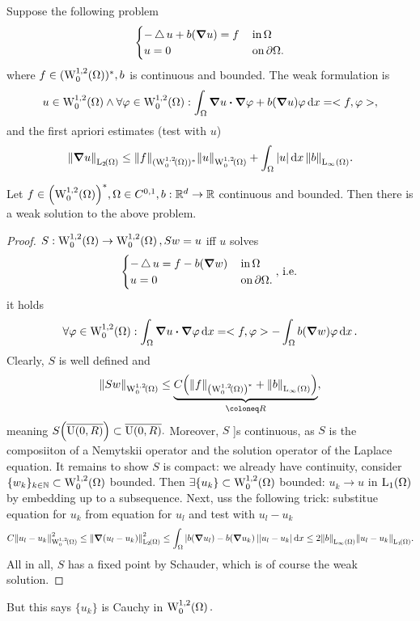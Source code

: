 \documentclass{article}
\begin{document}
\begin{example}
	Suppose the following problem
	\[
		\begin{cases}
			- \operatorname{\bigtriangleup} u + b\qty(\grad u) = f & \, \text{in} \, \Omega \\
			u = 0 & \, \text{on} \, \partial \Omega.
		\end{cases}
	\]
	where $f \in (\WkpzeroSet[1][2]{\Omega})^{*}, b$ is continuous and bounded. The weak formulation is
	\[
		u \in \WkpzeroSet[1][2]{\Omega} \wedge \forall \varphi \in \WkpzeroSet[1][2]{\Omega}: \int_{\Omega}\grad u \vdot \grad \varphi + b\qty(\grad u) \varphi\dd{x} = <f,\varphi>,
	\]
	and the first apriori estimates (test with $u$)
	\[
		\norm{\grad u}_{\LpSet[2]{\Omega}} \leq \norm{f}_{(\WkpzeroSet[1][2]{\Omega})^{*}} \norm{u}_{\WkpzeroSet[1][2]{\Omega}}+ \int_{\Omega}|u|\dd{x} \norm{b}_{\LinfSet{\Omega}}.
	\]
	\begin{theorem}
		Let $f \in \qty(\WkpzeroSet[1][2]{\Omega})^{*}, \Omega \in C^{0,1}, b: \R^d \to \R$ continuous and bounded. Then there is a weak solution to the above problem.
	\end{theorem}
	\begin{proof}
		$S: \WkpzeroSet[1][2]{\Omega} \to \WkpzeroSet[1][2]{\Omega}, Sw = u$ iff $u$ solves
		\[
			\begin{cases}
				- \operatorname{\bigtriangleup} u = f - b\qty(\grad w) & \, \text{in} \, \Omega \\
				u = 0 & \, \text{on} \, \partial \Omega.
			\end{cases}, \, \text{i.e.} \,
		\]
		it holds
		\[
			\forall \varphi \in \WkpzeroSet[1][2]{\Omega}: \int_{\Omega}\grad u \vdot \grad \varphi\dd{x} = <f, \varphi> - \int_{\Omega}b\qty(\grad w) \varphi\dd{x}.
		\]
		Clearly, $S$ is well defined and
		\[
			\norm{Sw}_{\WkpzeroSet[1][2]{\Omega}} \leq \underbrace{C\qty(\norm{f}_{\qty(\WkpzeroSet[1][2]{\Omega})^{*}}+ \norm{b}_{\LinfSet{\Omega}})}_{\coloneq R},
		\]
		meaning $S\qty(\overline{\text{U}(0,R)}) \subset \overline{\text{U}(0,R)}.$
		Moreover, $S$ ]s continuous, as $S$ is the composiiton of a Nemytskii operator and the solution operator of the Laplace equation. It remains to show $S$ is compact: we already have continuity, consider $\{w_k\}_{k \in \N} \subset \WkpzeroSet[1][2]{\Omega}$ bounded. Then $\exists \{u_k\} \subset \WkpzeroSet[1][2]{\Omega}$ bounded: $u_k \to u$ in $\LpSet[1]{\Omega}$ by embedding up to a subsequence. Next, uss the following trick: substitue equation for $u_k$ from equation for $u_l$ and test with $u_l - u_k$
		\[
			C \norm{u_l - u_k}_{\WkpzeroSet[1][2]{\Omega}}^{2} \leq	\norm{\grad\qty(u_l - u_k)}_{\LpSet[2]{\Omega}}^{2} \leq \int_{\Omega}|b(\grad u_l) - b\qty(\grad u_k)| |u_l - u_k|\dd{x} \leq 2 \norm{b}_{\LinfSet{\Omega}}\norm{u_l-u_k}_{\LpSet[1]{\Omega}}.
		\]
		All in all, $S$ has a fixed point by Schauder, which is of course the weak solution.
	\end{proof}
	But this says $\{u_k\}$ is Cauchy in $\WkpzeroSet[1][2]{\Omega}.$
\end{example}
\end{document}
